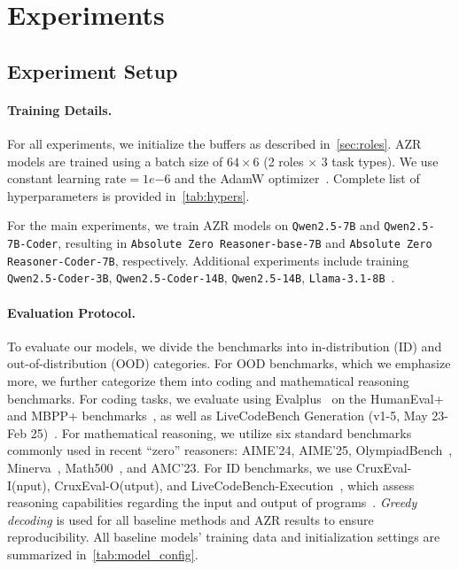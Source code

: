\documentclass{article}
\begin{document}
\section{Experiments}
\subsection{Experiment Setup}
\paragraph{Training Details.}
For all experiments, we initialize the buffers as described in~\cref{sec:roles}. AZR models are trained using a batch size of \(64 \times 6\) (2 roles \(\times\) 3 task types). We use constant learning rate\(=1e{-6}\) and the AdamW optimizer~\citep{loshchilov2017decoupled}. Complete list of hyperparameters is provided in~\cref{tab:hypers}.

For the main experiments, we train AZR models on \texttt{Qwen2.5-7B} and \texttt{Qwen2.5-7B-Coder}, resulting in \texttt{Absolute Zero Reasoner-base-7B} and \texttt{Absolute Zero Reasoner-Coder-7B}, respectively. Additional experiments include training \texttt{Qwen2.5-Coder-3B}, \texttt{Qwen2.5-Coder-14B}, \texttt{Qwen2.5-14B}, \texttt{Llama-3.1-8B}~\citep{yang2024qwen2,DBLP:journals/corr/abs-2409-12186,grattafiori2024llama3herdmodels}.

\paragraph{Evaluation Protocol.}
To evaluate our models, we divide the benchmarks into in-distribution (ID) and out-of-distribution (OOD) categories. For OOD benchmarks, which we emphasize more, we further categorize them into coding and mathematical reasoning benchmarks. For coding tasks, we evaluate using Evalplus~\citep{evalplus} on the HumanEval+ and MBPP+ benchmarks~\citep{chen2021evaluating,austin2021program}, as well as LiveCodeBench Generation (v1-5, May 23-Feb 25)~\citep{jain2024livecodebench}. For mathematical reasoning, we utilize six standard benchmarks commonly used in recent ``zero'' reasoners: AIME'24, AIME'25, OlympiadBench~\citep{He2024OlympiadBenchAC}, Minerva~\citep{lewkowycz2022solving}, Math500~\citep{hendrycks2021measuringmathematicalproblemsolving}, and AMC'23. For ID benchmarks, we use CruxEval-I(nput), CruxEval-O(utput), and LiveCodeBench-Execution~\citep{gu2024cruxeval,jain2024livecodebench}, which assess reasoning capabilities regarding the input and output of programs~\citep{li2025codei}. \emph{Greedy decoding} is used for all baseline methods and AZR results to ensure reproducibility. All baseline models' training data and initialization settings are summarized in~\cref{tab:model_config}.
\end{document}
